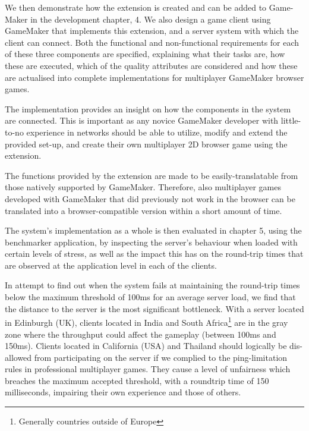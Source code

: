 \documentclass[bsc, 12pt, twoside, singlespacing, parskip, abbrevs, notimes, normalheadings, logo, deptreport]{styles/infthesis}
\begin{document}
\vspace{1em}
We then demonstrate how the extension is created and can be added to Game-Maker in the development chapter, 4. We also design a game client using GameMaker that implements this extension, and a server system with which the client can connect. Both the functional and non-functional requirements for each of these three components are specified, explaining what their tasks are, how these are executed, which of the quality attributes are considered and how these are actualised into complete implementations for multiplayer GameMaker browser games.

\vspace{1em}
The implementation provides an insight on how the components in the system are connected. This is important as any novice GameMaker developer with little-to-no experience in networks should be able to utilize, modify and extend the provided set-up, and create their own multiplayer 2D browser game using the extension.

\vspace{1em}
The functions provided by the extension are made to be easily-translatable from those natively supported by GameMaker. Therefore, also multiplayer games developed with GameMaker that did previously not work in the browser can be translated into a browser-compatible version within a short amount of time.

\vspace{1em}
The system's implementation as a whole is then evaluated in chapter 5, using the benchmarker application, by inspecting the server's behaviour when loaded with certain levels of stress, as well as the impact this has on the round-trip times that are observed at the application level in each of the clients.

\vspace{1em}
In attempt to find out when the system fails at maintaining the round-trip times below the maximum threshold of 100ms for an average server load, we find that the distance to the server is the most significant bottleneck. With a server located in Edinburgh (UK), clients located in India and South Africa\footnote{Generally countries outside of Europe} are in the gray zone where the throughput could affect the gameplay (between 100ms and 150ms). Clients located in California (USA) and Thailand should logically be dis-allowed from participating on the server if we complied to the ping-limitation rules in professional multiplayer games. They cause a level of unfairness which breaches the maximum accepted threshold, with a roundtrip time of 150 milliseconds, impairing their own experience and those of others.
\end{document}
